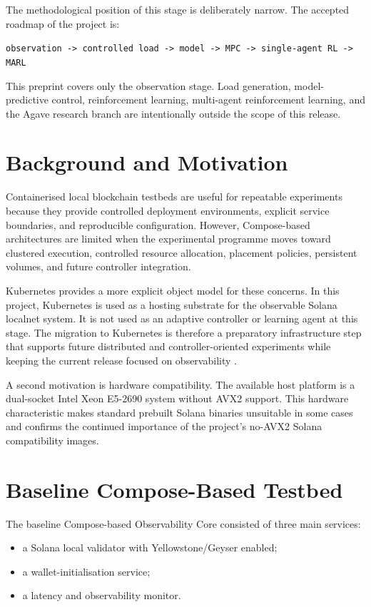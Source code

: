 \documentclass[11pt,a4paper]{article}
\begin{document}
The methodological position of this stage is deliberately narrow. The accepted roadmap of the project is:

\begin{center}
\texttt{observation -> controlled load -> model -> MPC -> single-agent RL -> MARL}
\end{center}

This preprint covers only the observation stage. Load generation, model-predictive control, reinforcement learning, multi-agent reinforcement learning, and the Agave research branch are intentionally outside the scope of this release.

\section{Background and Motivation}

Containerised local blockchain testbeds are useful for repeatable experiments because they provide controlled deployment environments, explicit service boundaries, and reproducible configuration. However, Compose-based architectures are limited when the experimental programme moves toward clustered execution, controlled resource allocation, placement policies, persistent volumes, and future controller integration.

Kubernetes provides a more explicit object model for these concerns. In this project, Kubernetes is used as a hosting substrate for the observable Solana localnet system. It is not used as an adaptive controller or learning agent at this stage. The migration to Kubernetes is therefore a preparatory infrastructure step that supports future distributed and controller-oriented experiments while keeping the current release focused on observability \citep{kubernetes_docs}.

A second motivation is hardware compatibility. The available host platform is a dual-socket Intel Xeon E5-2690 system without AVX2 support. This hardware characteristic makes standard prebuilt Solana binaries unsuitable in some cases and confirms the continued importance of the project's no-AVX2 Solana compatibility images.

\section{Baseline Compose-Based Testbed}

The baseline Compose-based Observability Core consisted of three main services:

\begin{itemize}
  \item a Solana local validator with Yellowstone/Geyser enabled;
  \item a wallet-initialisation service;
  \item a latency and observability monitor.
\end{itemize}
\end{document}
